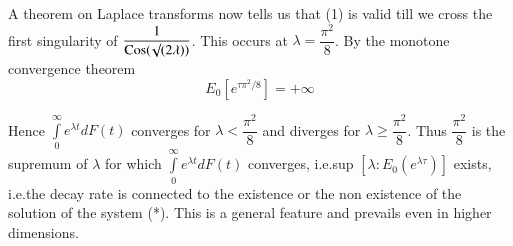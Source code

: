 A theorem on Laplace transforms now tells us that (1) is valid till we
cross the first singularity of $\dfrac{1}{\operatorname{Cos}
  (\surd(2\lambda))}$. This occurs at $\lambda=\dfrac{\pi^{2}}{8}$. By
the monotone convergence theorem
$$
E_{0}[e^{\tau\pi^{2}/8}]=+\infty
$$

Hence $\int\limits^{\infty}_{0}e^{\lambda t}dF(t)$ converges for
$\lambda<\dfrac{\pi^{2}}{8}$ and diverges for $\lambda\geq
\dfrac{\pi^{2}}{8}$. Thus $\dfrac{\pi^{2}}{8}$ is the supremum of
$\lambda$ for which $\int\limits^{\infty}_{0}e^{\lambda t}dF(t)$
converges, i.e.\@ sup $[\lambda:E_{0}(e^{\lambda \tau})]$ exists,
i.e.\@ the decay rate is connected to the existence or the non
existence of the solution of the system (*). This is a general feature
and prevails even in higher dimensions.

